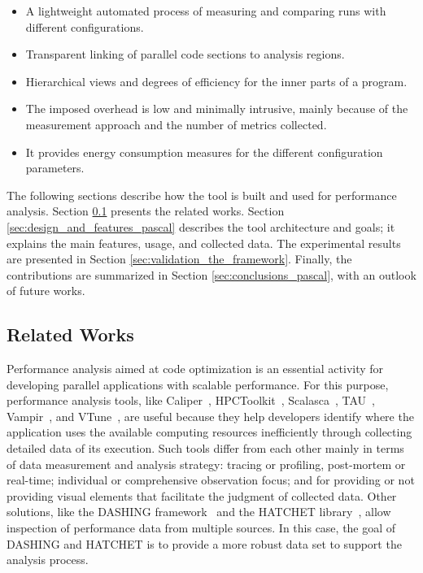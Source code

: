 \begin{itemize}
	\item A lightweight automated process of measuring and comparing runs with different configurations.
	\item Transparent linking of parallel code sections to analysis regions.
	\item Hierarchical views and degrees of efficiency for the inner parts of a program.
	\item The imposed overhead is low and minimally intrusive, mainly because of the measurement approach and the number of metrics collected.
	\item It provides energy consumption measures for the different configuration parameters. 
\end{itemize}

The following sections describe how the tool is built and used for performance analysis. Section \ref{sec:related_work_pascal} presents the related works. Section \ref{sec:design_and_features_pascal} describes the tool architecture and goals; it explains the main features, usage, and collected data. The experimental results are presented in Section \ref{sec:validation_the_framework}. Finally, the contributions are summarized in Section \ref{sec:conclusions_pascal}, with an outlook of future works.

\subsection{Related Works} \label{sec:related_work_pascal}

Performance analysis aimed at code optimization is an essential activity for developing parallel applications with scalable performance. For this purpose, performance analysis tools, like Caliper~\cite{Boehme2016}, HPCToolkit~\cite{Adhianto2010}, Scalasca~\cite{Geimer2010}, TAU~\cite{Shende2006}, Vampir~\cite{Weber2019}, and VTune~\cite{VTune}, are useful because they help developers identify where the application uses the available computing resources inefficiently through collecting detailed data of its execution. Such tools differ from each other mainly in terms of data measurement and analysis strategy: tracing or profiling, post-mortem or real-time; individual or comprehensive observation focus; and for providing or not providing visual elements that facilitate the judgment of collected data. Other solutions, like the DASHING framework~\cite{Islam2019} and the HATCHET library~\cite{Brink2020}, allow inspection of performance data from multiple sources. In this case, the goal of DASHING and HATCHET is to provide a more robust data set to support the analysis process.

